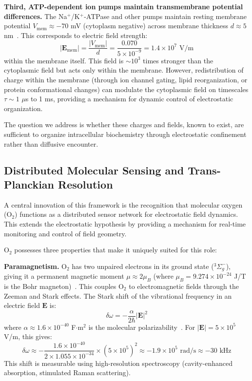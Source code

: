 \documentclass[twocolumn,10pt,aps,prd,superscriptaddress,floatfix,nofootinbib]{revtex4-2}
\theoremstyle{remark}
\begin{document}
\textbf{Third, ATP-dependent ion pumps maintain transmembrane potential differences.} The Na$^+$/K$^+$-ATPase and other pumps maintain resting membrane potential $V_{\mathrm{mem}} \approx -70$ mV (cytoplasm negative) across membrane thickness $d \approx 5$ nm~\cite{Hille2001}. This corresponds to electric field strength:
\begin{equation}
|\mathbf{E}_{\mathrm{mem}}| = \frac{|V_{\mathrm{mem}}|}{d} = \frac{0.070}{5 \times 10^{-9}} = 1.4 \times 10^{7} \text{ V/m}
\label{eq:membrane_field}
\end{equation}
within the membrane itself. This field is $\sim 10^{3}$ times stronger than the cytoplasmic field but acts only within the membrane. However, redistribution of charge within the membrane (through ion channel gating, lipid reorganization, or protein conformational changes) can modulate the cytoplasmic field on timescales $\tau \sim 1$ $\mu$s to 1 ms, providing a mechanism for dynamic control of electrostatic organization.

The question we address is whether these charges and fields, known to exist, are sufficient to organize intracellular biochemistry through electrostatic confinement rather than diffusive encounter.

\subsection{Distributed Molecular Sensing and Trans-Planckian Resolution}

A central innovation of this framework is the recognition that molecular oxygen (O$_2$) functions as a distributed sensor network for electrostatic field dynamics. This extends the electrostatic hypothesis by providing a mechanism for real-time monitoring and control of field geometry.

O$_2$ possesses three properties that make it uniquely suited for this role:

\textbf{Paramagnetism.} O$_2$ has two unpaired electrons in its ground state ($^3\Sigma_g^-$), giving it a permanent magnetic moment $\mu \approx 2\mu_B$ (where $\mu_B = 9.274 \times 10^{-24}$ J/T is the Bohr magneton)~\cite{Atkins2011}. This couples O$_2$ to electromagnetic fields through the Zeeman and Stark effects. The Stark shift of the vibrational frequency in an electric field $\mathbf{E}$ is:
\begin{equation}
\delta\omega = -\frac{\alpha}{2\hbar} |\mathbf{E}|^2
\label{eq:stark_shift}
\end{equation}
where $\alpha \approx 1.6 \times 10^{-40}$ F$\cdot$m$^2$ is the molecular polarizability~\cite{Maroulis2001}. For $|\mathbf{E}| = 5 \times 10^{5}$ V/m, this gives:
\begin{equation}
\delta\omega \approx -\frac{1.6 \times 10^{-40}}{2 \times 1.055 \times 10^{-34}} \times (5 \times 10^{5})^2 \approx -1.9 \times 10^{5} \text{ rad/s} \approx -30 \text{ kHz}
\end{equation}
This shift is measurable using high-resolution spectroscopy (cavity-enhanced absorption, stimulated Raman scattering).
\end{document}
